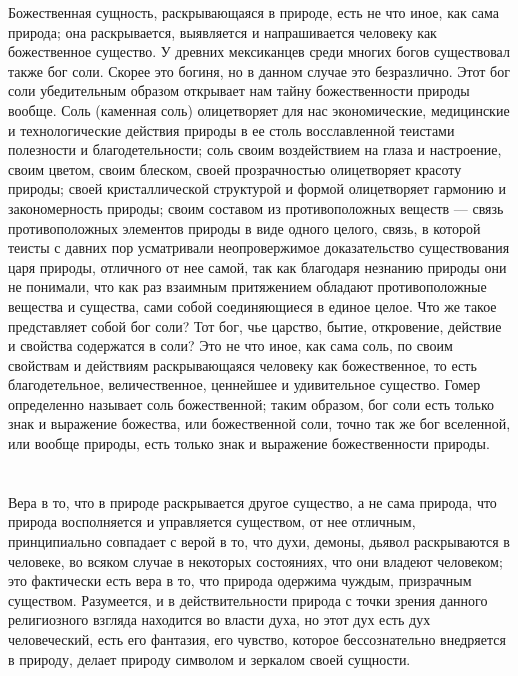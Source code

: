 \documentclass[12pt]{article}
\begin{document}
Божественная сущность, раскрывающаяся в природе, есть не что иное, как сама природа; она раскрывается, выявляется и напрашивается человеку как божественное существо. У древних мексиканцев среди многих богов существовал также бог соли. Скорее это богиня, но в данном случае это безразлично. Этот бог соли убедительным образом открывает нам тайну божественности природы вообще. Соль (каменная соль) олицетворяет для нас экономические, медицинские и технологические действия природы в ее столь восславленной теистами полезности и благодетельности; соль своим воздействием на глаза и настроение, своим цветом, своим блеском, своей прозрачностью олицетворяет красоту природы; своей кристаллической структурой и формой олицетворяет гармонию и закономерность природы; своим составом из противоположных веществ --- связь противоположных элементов природы в виде одного целого, связь, в которой теисты с давних пор усматривали неопровержимое доказательство существования царя природы, отличного от нее самой, так как благодаря незнанию природы они не понимали, что как раз взаимным притяжением обладают противоположные вещества и существа, сами собой соединяющиеся в единое целое. Что же такое представляет собой бог соли? Тот бог, чье царство, бытие, откровение, действие и свойства содержатся в соли? Это не что иное, как сама соль, по своим свойствам и действиям раскрывающаяся человеку как божественное, то есть благодетельное, величественное, ценнейшее и удивительное существо. Гомер определенно называет соль божественной; таким образом, бог соли есть только знак и выражение божества, или божественной соли, точно так же бог вселенной, или вообще природы, есть только знак и выражение божественности природы.



\section{}

Вера в то, что в природе раскрывается другое существо, а не сама природа, что природа восполняется и управляется существом, от нее отличным, принципиально совпадает с верой в то, что духи, демоны, дьявол раскрываются в человеке, во всяком случае в некоторых состояниях, что они владеют человеком; это фактически есть вера в то, что природа одержима чуждым, призрачным существом. Разумеется, и в действительности природа с точки зрения данного религиозного взгляда находится во власти духа, но этот дух есть дух человеческий, есть его фантазия, его чувство, которое бессознательно внедряется в природу, делает природу символом и зеркалом своей сущности.
\end{document}
